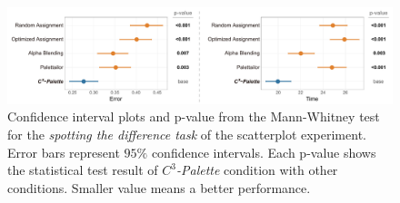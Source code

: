 {\begin{figure}[h]
\centering
\includegraphics[width=1\linewidth]{figures/difference-results.pdf}
\caption{Confidence interval plots and p-value from the Mann-Whitney test for the \emph{spotting the difference task} of the scatterplot experiment. Error bars represent $95\%$ confidence intervals. Each p-value shows the statistical test result of \emph{$C^3$-Palette} condition with other conditions. Smaller value means a better performance.}
\vspace*{-3mm}
\label{fig:userResults}
\end{figure}




}

